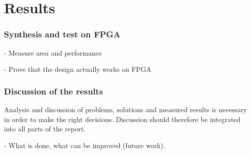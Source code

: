 \chapter{Results}
 
\subsection{Synthesis and test on FPGA}

- Measure area and performance

- Prove that the design actually works on FPGA

\subsection{Discussion of the results}
 
Analysis and discussion of problems, solutions and measured results is necessary in order to make the right decisions. Discussion should therefore be integrated into all parts of the report. 

- What is done, what can be improved (future work).
